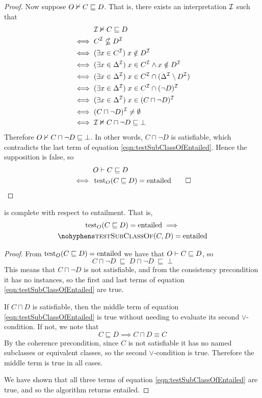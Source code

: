 \documentclass[paper.tex]{subfiles}
\begin{document}
\begin{proof}
  Now suppose $O \nvdash C \sqsubseteq D$.  That is, there exists an interpretation $\mathcal{I}$ such that
  \begin{align*}
    & \mathcal{I} \nvDash C \sqsubseteq D \\
    \iff{}& C^{\mathcal{I}} \nsubseteq D^{\mathcal{I}} \\
    \iff{}& (\exists x \in C^{\mathcal{I}}) \; x \notin D^{\mathcal{I}} \\
    \iff{}& (\exists x \in \Delta^{\mathcal{I}}) \; x \in C^{\mathcal{I}} \land x \notin D^{\mathcal{I}} \\
    \iff{}& (\exists x \in \Delta^{\mathcal{I}}) \; x \in C^{\mathcal{I}} \cap (\Delta^{\mathcal{I}} \setminus D^{\mathcal{I}}) \\
    \iff{}& (\exists x \in \Delta^{\mathcal{I}}) \; x \in C^{\mathcal{I}} \cap (\neg D)^{\mathcal{I}} \\
    \iff{}& (\exists x \in \Delta^{\mathcal{I}}) \; x \in (C \sqcap \neg D)^{\mathcal{I}} \\
    \iff{}& (C \sqcap \neg D)^{\mathcal{I}} \ne \emptyset \\
    \iff{}& \mathcal{I} \nvDash C \sqcap \neg D \sqsubseteq \bot
  \end{align*}
  Therefore $O \nvdash C \sqcap \neg D \sqsubseteq \bot$.  In other words, $C \sqcap \neg D$ is satisfiable, which contradicts the last term of equation \ref{eqn:testSubClassOfEntailed}.  Hence the supposition is false, so
  \begin{align*}
    & O \vdash C \sqsubseteq D \\
    \iff{}& \operatorname{test}_O(C \sqsubseteq D) = \mathrm{entailed}
    \qed
  \end{align*}
\end{proof}

\begin{lemma}
  \label{lem:testSubClassOfEntailedComplete}
   is complete with respect to entailment.  That is,
  \begin{multline*}
    \test_O(C \sqsubseteq D) = \mathrm{entailed} \implies \\
    \textproc{testSubClassOf}(C, D) = \mathrm{entailed}
  \end{multline*}
\end{lemma}
\begin{proof}
  From $\operatorname{test}_O(C \sqsubseteq D) = \mathrm{entailed}$ we have that $O \vdash C \sqsubseteq D$, so
  \[ C \sqcap \neg D \;\sqsubseteq\; D \sqcap \neg D \;\sqsubseteq\; \bot \]
  This means that $C \sqcap \neg D$ is not satisfiable, and from the consistency precondition it has no instances, so the first and last terms of equation \ref{eqn:testSubClassOfEntailed} are true.

  If $C \sqcap D$ is satisfiable, then the middle term of equation \ref{eqn:testSubClassOfEntailed} is true without needing to evaluate its second $\lor$-condition.  If not, we note that
  \[ C \sqsubseteq D \implies C \sqcap D \equiv C\]
  By the coherence precondition, since $C$ is not satisfiable it has no named subclasses or equivalent classes, so the second $\lor$-condition is true.  Therefore the middle term is true in all cases.

  We have shown that all three terms of equation \ref{eqn:testSubClassOfEntailed} are true, and so the algorithm returns entailed.
\end{proof}
\end{document}
